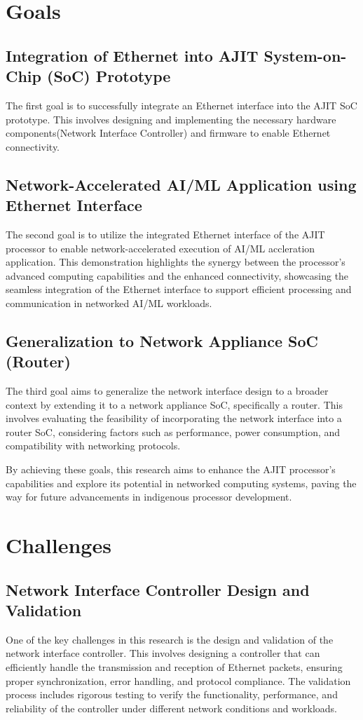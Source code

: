 \documentclass[a4paper,11pt, final]{report}
\begin{document}
	\section{Goals}

		\subsection{Integration of Ethernet into AJIT System-on-Chip (SoC) Prototype}
			The first goal is to successfully integrate an Ethernet interface into the AJIT SoC prototype. This involves designing and implementing the necessary hardware components(Network Interface Controller) and firmware to enable Ethernet connectivity.

		\subsection{Network-Accelerated AI/ML Application using Ethernet Interface}
			The second goal is to utilize the integrated Ethernet interface of the AJIT processor to enable network-accelerated execution of AI/ML accleration application. This demonstration highlights the synergy between the processor's advanced computing capabilities and the enhanced connectivity, showcasing the seamless integration of the Ethernet interface to support efficient processing and communication in networked AI/ML workloads.

		\subsection{Generalization to Network Appliance SoC (Router)}
			The third goal aims to generalize the network interface design to a broader context by extending it to a network appliance SoC, specifically a router. This involves evaluating the feasibility of incorporating the network interface into a router SoC, considering factors such as performance, power consumption, and compatibility with networking protocols.

By achieving these goals, this research aims to enhance the AJIT processor's capabilities and explore its potential in networked computing systems, paving the way for future advancements in indigenous processor development.

	\section{Challenges}

		\subsection{Network Interface Controller Design and Validation}
   One of the key challenges in this research is the design and validation of the network interface controller. This involves designing a controller that can efficiently handle the transmission and reception of Ethernet packets, ensuring proper synchronization, error handling, and protocol compliance. The validation process includes rigorous testing to verify the functionality, performance, and reliability of the controller under different network conditions and workloads.\\
\end{document}
